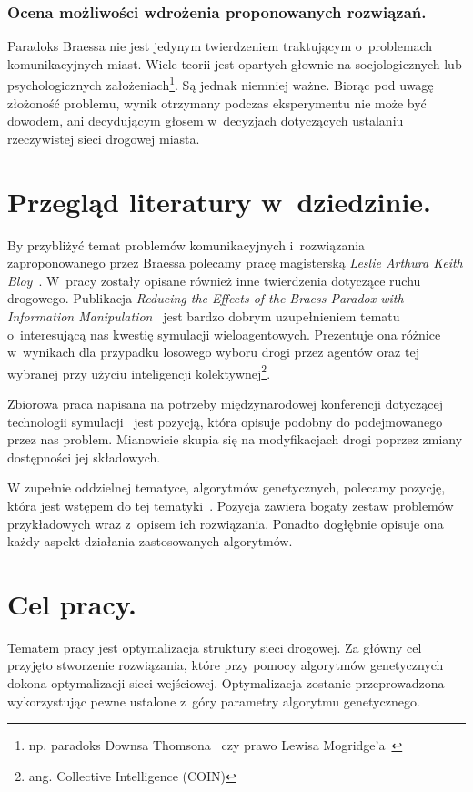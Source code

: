 \documentclass[twoside,12pt]{report}
\begin{document}
\subsubsection{Ocena możliwości wdrożenia proponowanych rozwiązań.}
Paradoks Braessa nie jest jedynym twierdzeniem traktującym o~problemach komunikacyjnych miast. Wiele teorii jest opartych głownie na socjologicznych lub psychologicznych założeniach\footnote{np. paradoks Downsa Thomsona~\cite{downs} czy prawo Lewisa Mogridge’a~\cite{lewis}}. Są jednak niemniej ważne. Biorąc pod uwagę złożoność problemu, wynik otrzymany podczas eksperymentu nie może być dowodem, ani decydującym głosem w~decyzjach dotyczących ustalaniu rzeczywistej sieci drogowej miasta. 


\section{Przegląd literatury w~dziedzinie.}
By przybliżyć temat problemów komunikacyjnych i~rozwiązania zaproponowanego przez Braessa polecamy pracę magisterską \textit{Leslie Arthura Keith Bloy}~\cite{investigation}. W~pracy zostały opisane również inne twierdzenia dotyczące ruchu drogowego. Publikacja \textit{Reducing the Effects of the Braess Paradox with Information Manipulation}~\cite{reducingtheeffects} jest bardzo dobrym uzupełnieniem tematu o~interesującą nas kwestię symulacji wieloagentowych. Prezentuje ona różnice w~wynikach dla przypadku losowego wyboru drogi przez agentów oraz tej wybranej przy użyciu inteligencji kolektywnej\footnote{ang. Collective Intelligence (COIN)}. 

Zbiorowa praca napisana na potrzeby międzynarodowej konferencji dotyczącej technologii symulacji~\cite{reducingtheeffects} jest pozycją, która opisuje podobny do podejmowanego przez nas problem. Mianowicie skupia się na modyfikacjach drogi poprzez zmiany dostępności jej składowych.

W zupełnie oddzielnej tematyce, algorytmów genetycznych, polecamy pozycję, która jest wstępem do tej tematyki~\cite{gene}. Pozycja zawiera bogaty zestaw problemów przykładowych wraz z~opisem ich rozwiązania. Ponadto dogłębnie opisuje ona każdy aspekt działania zastosowanych algorytmów. 

\section{Cel pracy.}
Tematem pracy jest optymalizacja struktury sieci drogowej. Za główny cel przyjęto stworzenie rozwiązania, które przy pomocy algorytmów genetycznych dokona optymalizacji sieci wejściowej. Optymalizacja zostanie przeprowadzona wykorzystując pewne ustalone z~góry parametry algorytmu genetycznego.
 
\end{document}
